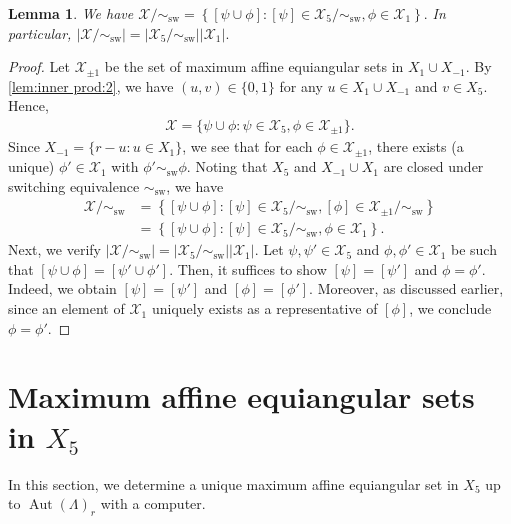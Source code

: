 \documentclass[reqno, 11pt]{amsart}
\numberwithin{equation}{section}
\newtheorem{lem}{Lemma}[section]
\theoremstyle{definition}
\DeclareMathOperator{\Aut}{Aut}
\DeclareMathOperator{\sw}{sw}
\newcommand{\aeso}{\phi}
\newcommand{\aesf}{\psi}
\newcommand{\cX}{\mathcal{X}}
\newcommand{\sr}{ r } %
\begin{document}
\begin{lem}	\label{lem:chi}
	We have
	$\cX/\sim_{\sw}
		= \left\{ [\aesf \cup \aeso] : [\aesf] \in \cX_5/\sim_{\sw}, \aeso \in \cX_1 \right\}.$
	In particular, $\left|\cX/\sim_{\sw} \right| = \left|\cX_5/\sim_{\sw} \right| \left| \cX_1 \right|.$
\end{lem}
\begin{proof}
	Let $\cX_{\pm1}$ be the set of maximum affine equiangular sets in $X_1 \cup X_{-1}$.
	By \eqref{lem:inner prod:2}, we have $(u,v) \in \{0,1\}$ for any $u \in X_1 \cup X_{-1}$ and $v \in X_5$.
	Hence,
	\begin{align*}
		\cX = \{ \aesf \cup \aeso : \aesf \in \cX_5, \aeso \in \cX_{\pm1} \}.
	\end{align*}
	Since $X_{-1} = \{ \sr - u  :  u \in X_1 \}$, we see that for each $\phi \in \cX_{\pm1}$, there exists (a unique) $\phi' \in \cX_1$ with $\phi' \sim_{\sw} \phi.$
	Noting that $X_5$ and $X_{-1} \cup X_1$ are closed under switching equivalence $\sim_{\sw}$, we have
	\begin{align*}
		\cX/\sim_{\sw}
		 & = \left\{ [\aesf \cup \aeso] : [\aesf] \in \cX_5/\sim_{\sw}, [\aeso] \in \cX_{\pm1} /\sim_{\sw} \right\} \\
		 & = \left\{ [\aesf \cup \aeso] : [\aesf] \in \cX_5/\sim_{\sw}, \aeso \in \cX_1 \right\}.
	\end{align*}
	Next, we verify $\left|\cX/\sim_{\sw} \right| = \left|\cX_5/\sim_{\sw} \right| \left| \cX_1 \right|.$
	Let $\aesf, \aesf' \in \cX_5$ and $\aeso, \aeso' \in \cX_1$ be such that $[\aesf \cup \aeso] = [\aesf' \cup \aeso']$.
	Then, it suffices to show $[\aesf] = [\aesf']$ and $\aeso = \aeso'$.
	Indeed, we obtain $[\aesf] = [\aesf']$ and $[\aeso] = [\aeso']$.
	Moreover, as discussed earlier, since an element of $\cX_1$ uniquely exists as a representative of $[\aeso]$, we conclude $\aeso = \aeso'$.	
\end{proof}

\section{Maximum affine equiangular sets in $X_5$}	\label{sec:X5}
In this section, we determine a unique maximum affine equiangular set in $X_5$ up to $\Aut(\Lambda)_{\sr}$ with a computer.
\end{document}
